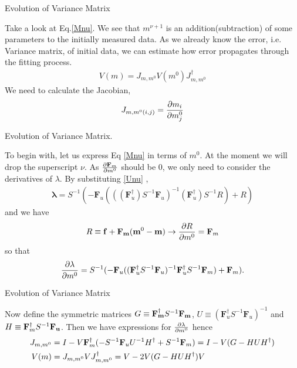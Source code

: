 \documentclass[
	xcolor=dvipsnames,
	10pt, 
	]{beamer}
\begin{document}
\begin{frame}{Evolution of Variance Matrix}
	\begin{block}{}
		Take a look at Eq.\eqref{Mnu}. We see that $m^{\nu+1} $ is an addition(subtraction) of some parameters to the initially measured data. As we already know the error, i.e. Variance matrix, of initial data, we can estimate how error propagates through the fitting process. 
		\begin{align}
			V(m) = J_{m,m^0}V(m^0)J_{m,m^0}^\dagger
		\end{align}
		We need to calculate the Jacobian, 
		\begin{align}
			J_{m,m^0(i,j)} = \frac{\partial m_i}{\partial m^0_j}
		\end{align}
	\end{block}
\end{frame}
\begin{frame}{Evolution of Variance Matrix.}
	\begin{block}{}
		To begin with, let us express Eq \eqref{Mnu} in terms of $m^0$. At the moment we will drop the superscript $\nu$. As $\frac{\partial \mathbf{F}_m}{\partial m^0} $ should be 0, we only need to consider the derivatives of $\lambda$. By substituting \eqref{Unu} ,
		\begin{align}
	\mathbf\lambda = S^{-1}(-\mathbf F_u(((\mathbf{F}_u^\dagger) S^{-1}\mathbf F_u)^{-1}(\mathbf{F}_u^\dagger) S^{-1}R) + R)
		\end{align}
		and we have
		\begin{align}
			R\equiv \mathbf f + \mathbf{F}_\mathbf{m}(\mathbf{m}^0-\mathbf{m})\to \frac{\partial R}{\partial m^0}= \mathbf{F}_m
		\end{align} 
		so that 
		\begin{align}
			\frac{\partial \lambda}{\partial m^0}= S^{-1}(-\mathbf F_u((\mathbf{F}_u^\dagger S^{-1}\mathbf F_u)^{-1}\mathbf{F}_u^\dagger S^{-1}\mathbf{F}_m) + \mathbf{F}_m).
		\end{align}
	\end{block}
\end{frame}
\begin{frame}{Evolution of Variance Matrix}
	\begin{block}{}
		Now define the symmetric matrices $G\equiv \mathbf{F_m^\dagger} S^{-1}\mathbf{F_m}$, $U\equiv (\mathbf{F}_u^\dagger S^{-1}\mathbf F_u)^{-1}$ and $H\equiv \mathbf{F}_m^\dagger S^{-1}\mathbf{F_u}$. Then we have expressions for $\frac{\partial \lambda}{\partial m^0}$ hence 
		\begin{align}
			J_{m,m^0}&=I - V\mathbf{F}^\dagger_m(-S^{-1}\mathbf{F}_u U^{-1}H^\dagger+S^{-1}\mathbf{F}_m)=I-V(G-HUH^\dagger)\\
			V(m)& = J_{m,m^0} VJ_{m,m^0}^\dagger = V -2 V(G-HUH^\dagger)V 
		\end{align}
	\end{block}
\end{frame}
\end{document}
